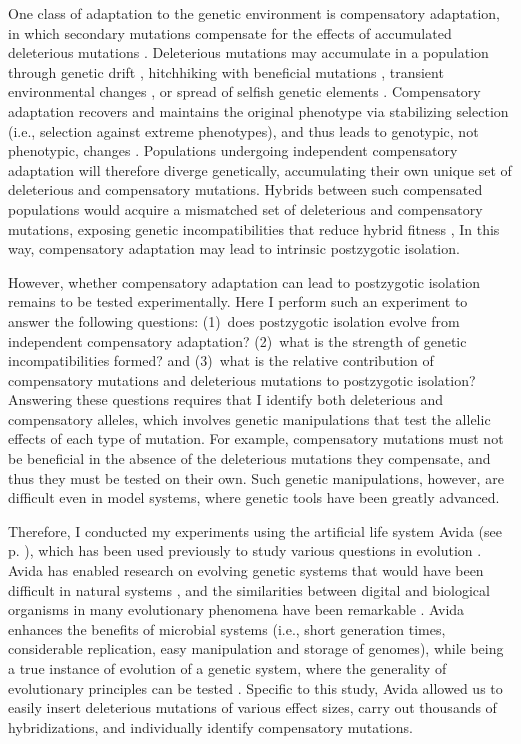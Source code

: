 \begin{doublespace}
One class of adaptation to the genetic environment
is compensatory adaptation, in which secondary mutations
compensate for the effects of accumulated deleterious mutations
\citep{har96,bur99,moo00,lev00,mai02,est03,est11}.
%
Deleterious mutations may accumulate in a population
through genetic drift \citep{lan94,lyn95},
hitchhiking with beneficial mutations \citep{chu11},
transient environmental changes \citep{bjo00},
or spread of selfish genetic elements \citep{pre10}.
%
Compensatory adaptation recovers and maintains the original phenotype
via stabilizing selection (i.e., selection against extreme phenotypes),
and thus leads to genotypic, not phenotypic, changes \citep{har96}.
%
Populations undergoing independent compensatory adaptation
will therefore diverge genetically, accumulating their own unique set
of deleterious and compensatory mutations.
%
Hybrids between such compensated populations would acquire
a mismatched set of deleterious and compensatory mutations,
exposing genetic incompatibilities that reduce hybrid fitness
\citep{har96,orr01,kon02,kul04,lan07,sch09b,pre10},
%
In this way, compensatory adaptation may lead to
intrinsic postzygotic isolation.



However, whether compensatory adaptation can lead to postzygotic isolation
remains to be tested experimentally.
%
Here I perform such an experiment to answer the following questions:
(1)~does postzygotic isolation evolve from independent compensatory adaptation?
(2)~what is the strength of genetic incompatibilities formed?
and (3)~what is the relative contribution of compensatory mutations
and deleterious mutations to postzygotic isolation?
%
Answering these questions requires that I identify
both deleterious and compensatory alleles,
which involves genetic manipulations that test the allelic
effects of each type of mutation.
%
For example, compensatory mutations must not be beneficial
in the absence of the deleterious mutations they compensate,
and thus they must be tested on their own.
%
Such genetic manipulations, however, are difficult even in
model systems, where genetic tools have been greatly advanced.



Therefore, I conducted my experiments using the artificial life system
Avida \citep{ofr04} (see p. \pageref{sec:avida}),
which has been used previously to study various questions
in evolution \citep{len99,len03,cho04,mis06,ele07,ele08,mis10}.
%
Avida has enabled research on evolving genetic systems
that would have been difficult in natural systems \citep{ada06},
and the similarities between digital and biological organisms
in many evolutionary phenomena have been remarkable \citep{wil02,ada06}.
%
Avida enhances the benefits of microbial systems
(i.e., short generation times, considerable replication,
easy manipulation and storage of genomes),
while being a true instance of evolution of a genetic system,
where the generality of evolutionary principles can be tested
\citep{len99,ele08,mis06}.
%
Specific to this study, Avida allowed us to easily insert deleterious mutations
of various effect sizes, carry out thousands of hybridizations,
and individually identify compensatory mutations.




\end{doublespace}
